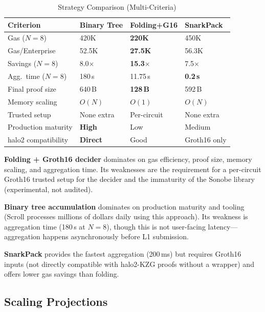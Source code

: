 \begin{table}[htbp]
\centering
\caption{Strategy Comparison (Multi-Criteria)}
\label{tab:strategy-comparison}
\begin{tabular}{@{}p{2.2cm}p{1.5cm}p{1.5cm}p{1.7cm}@{}}
\toprule
\textbf{Criterion} & \textbf{Binary Tree} & \textbf{Folding+G16} & \textbf{SnarkPack} \\
\midrule
Gas ($N{=}8$)           & 420K         & \textbf{220K} & 450K \\
Gas/Enterprise          & 52.5K        & \textbf{27.5K}& 56.3K \\
Savings ($N{=}8$)       & 8.0$\times$  & \textbf{15.3$\times$} & 7.5$\times$ \\
Agg.\ time ($N{=}8$)    & 180\,s       & 11.75\,s      & \textbf{0.2\,s} \\
Final proof size        & 640\,B       & \textbf{128\,B}& 592\,B \\
Memory scaling          & $O(N)$       & \textbf{$O(1)$}& $O(N)$ \\
Trusted setup           & None extra   & Per-circuit    & None extra \\
Production maturity     & \textbf{High}& Low           & Medium \\
halo2 compatibility     & \textbf{Direct}& Good        & Groth16 only \\
\bottomrule
\end{tabular}
\end{table}

\textbf{Folding + Groth16 decider} dominates on gas efficiency, proof
size, memory scaling, and aggregation time. Its weaknesses are the
requirement for a per-circuit Groth16 trusted setup for the decider and
the immaturity of the Sonobe library (experimental, not audited).

\textbf{Binary tree accumulation} dominates on production maturity and
tooling (Scroll processes millions of dollars daily using this
approach). Its weakness is aggregation time (180\,s at $N{=}8$), though
this is not user-facing latency---aggregation happens asynchronously
before L1 submission.

\textbf{SnarkPack} provides the fastest aggregation (200\,ms) but
requires Groth16 inputs (not directly compatible with halo2-KZG
proofs without a wrapper) and offers lower gas savings than folding.

\subsection{Scaling Projections}

